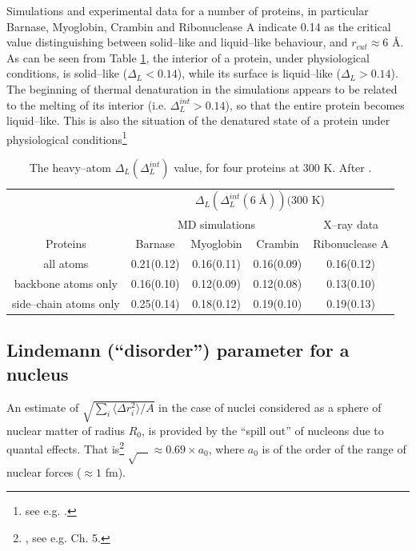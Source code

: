 \begin{subappendices}
Simulations and experimental data for a number of proteins, in particular Barnase, Myoglobin, Crambin and Ribonuclease A indicate 0.14 as the critical value distinguishing between solid--like and liquid--like behaviour, and $r_{cut}\approx 6$ \AA. As can be seen from Table \ref{tab2C1}, the interior of a protein, under physiological conditions, is solid--like  ($\Delta_L<0.14$), while its surface is liquid--like ($\Delta_L>0.14$). The beginning of thermal denaturation in the simulations appears to be related to the melting of its interior (i.e. $\Delta^{int}_L>0.14$), so that the entire protein becomes liquid--like. This is also the situation of the denatured state of a protein under physiological conditions\footnote{see e.g. \cite{Rosner:17}.} 



\begin{table}[h]
 \begin{tabular}{|c|c|c|c|c|}
 \hline
 &\multicolumn{4}{|c|}{$\Delta_L(\Delta_L^{int}(6\;\text{\AA}))(300$ K)}\\
 \cline{2-5}
 &\multicolumn{3}{|c|}{MD simulations}&X--ray data\\
 \hline
 Proteins&Barnase&Myoglobin&Crambin&Ribonuclease A\\
 \hline
 all atoms&0.21(0.12)&0.16(0.11)&0.16(0.09)&0.16(0.12)\\
 backbone atoms only&0.16(0.10)&0.12(0.09)&0.12(0.08)&0.13(0.10)\\
 side--chain atoms only&0.25(0.14)&0.18(0.12)&0.19(0.10)&0.19(0.13)\\
 \hline
 \end{tabular}
 \caption{The heavy--atom $\Delta_L(\Delta_L^{int})$ value, for four proteins at 300 K. After \cite{Zhou:99}.}\label{tab2C1}
 \end{table}

\subsection{Lindemann (``disorder'') parameter for a nucleus}
An estimate of  $\sqrt{\sum_i\langle \Delta r_i^2\rangle/A}$ in the case of nuclei considered as a sphere of nuclear matter of radius $R_0$, is provided by the ``spill out'' of nucleons due to quantal effects. That is\footnote{\cite{Bertsch:05}, see e.g. Ch. 5.} $\sqrt{\quad}\approx 0.69\times a_0$, where $a_0$ is of the order of the range of nuclear forces ($\approx 1$ fm).



\end{subappendices}
